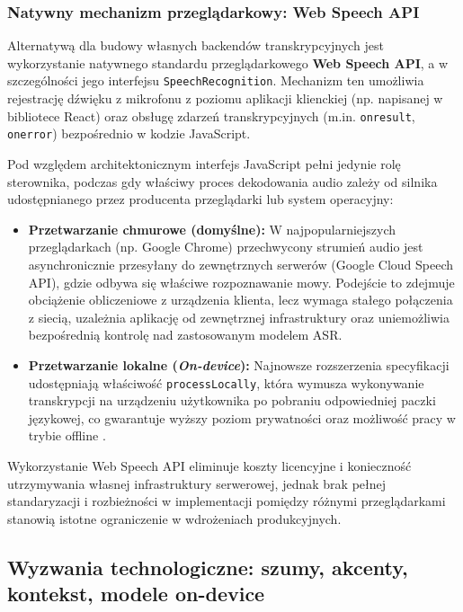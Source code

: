 \subsubsection{Natywny mechanizm przeglądarkowy: Web Speech API}

Alternatywą dla budowy własnych backendów transkrypcyjnych jest wykorzystanie natywnego standardu przeglądarkowego \textbf{Web Speech API}, a w szczególności jego interfejsu \texttt{SpeechRecognition}. Mechanizm ten umożliwia rejestrację dźwięku z mikrofonu z poziomu aplikacji klienckiej (np. napisanej w bibliotece React) oraz obsługę zdarzeń transkrypcyjnych (m.in. \texttt{onresult}, \texttt{onerror}) bezpośrednio w kodzie JavaScript.

Pod względem architektonicznym interfejs JavaScript pełni jedynie rolę sterownika, podczas gdy właściwy proces dekodowania audio zależy od silnika udostępnianego przez producenta przeglądarki lub system operacyjny:
\begin{itemize}
\item \textbf{Przetwarzanie chmurowe (domyślne):} W najpopularniejszych przeglądarkach (np. Google Chrome) przechwycony strumień audio jest asynchronicznie przesyłany do zewnętrznych serwerów (Google Cloud Speech API), gdzie odbywa się właściwe rozpoznawanie mowy. Podejście to zdejmuje obciążenie obliczeniowe z urządzenia klienta, lecz wymaga stałego połączenia z siecią, uzależnia aplikację od zewnętrznej infrastruktury oraz uniemożliwia bezpośrednią kontrolę nad zastosowanym modelem ASR.

\item \textbf{Przetwarzanie lokalne (\textit{On-device}):} Najnowsze rozszerzenia specyfikacji udostępniają właściwość \texttt{processLocally}, która wymusza wykonywanie transkrypcji na urządzeniu użytkownika po pobraniu odpowiedniej paczki językowej, co gwarantuje wyższy poziom prywatności oraz możliwość pracy w trybie offline \cite{mdnWebSpeechAPI}.
\end{itemize}
Wykorzystanie Web Speech API eliminuje koszty licencyjne i konieczność utrzymywania własnej infrastruktury serwerowej, jednak brak pełnej standaryzacji i rozbieżności w implementacji pomiędzy różnymi przeglądarkami stanowią istotne ograniczenie w wdrożeniach produkcyjnych.


\subsection{Wyzwania technologiczne: szumy, akcenty, kontekst, modele on-device}
\label{subsec:technological_challenges}


